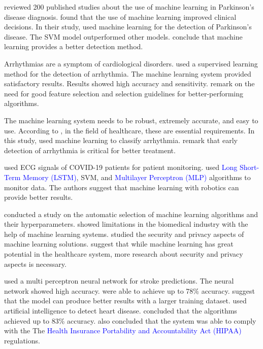 \documentclass[a4paper,fleqn]{cas-dc}
\newcommand{\responsemodsm}[1]{\textcolor{blue}{#1}}
\begin{document}
\cite*{ref_paper_27} reviewed 200 published studies about the use of machine learning in Parkinson's disease diagnosis. \citeauthor{ref_paper_27} found that the use of machine learning improved clinical decisions. In their study, \cite*{ref_paper_30} used machine learning for the detection of Parkinson's disease. The SVM model outperformed other models. \citeauthor{ref_paper_30} conclude that machine learning provides a better detection method.

Arrhythmias are a symptom of cardiological disorders. \cite*{ref_paper_28} used a supervised learning method for the detection of arrhythmia. The machine learning system provided satisfactory results. Results showed high accuracy and sensitivity. \citeauthor{ref_paper_28} remark on the need for good feature selection and selection guidelines for better-performing algorithms.

The machine learning system needs to be robust, extremely accurate, and easy to use. According to \cite*{ref_paper_4}, in the field of healthcare, these are essential requirements. In this study, \citeauthor{ref_paper_4} used machine learning to classify arrhythmia. \citeauthor{ref_paper_4} remark that early detection of arrhythmia is critical for better treatment.

\cite*{ref_paper_40} used ECG signals of COVID-19 patients for patient monitoring. \citeauthor{ref_paper_40} used \responsemodsm{Long Short-Term Memory (LSTM)}, SVM, and \responsemodsm{Multilayer Perceptron (MLP)} algorithms to monitor data. The authors suggest that machine learning with robotics can provide better results.

\cite*{ref_paper_32} conducted a study on the automatic selection of machine learning algorithms and their hyperparameters. \citeauthor{ref_paper_32} showed limitations in the biomedical industry with the help of machine learning systems. \cite*{ref_paper_37} studied the security and privacy aspects of machine learning solutions. \citeauthor{ref_paper_37} suggest that while machine learning has great potential in the healthcare system, more research about security and privacy aspects is necessary.

\cite*{ref_paper_42} used a multi perceptron neural network for stroke predictions. The neural network showed high accuracy. \citeauthor{ref_paper_42} were able to achieve up to 78\% accuracy. \citeauthor{ref_paper_42} suggest that the model can produce better results with a larger training dataset. \cite*{ref_paper_41} used artificial intelligence to detect heart disease. \citeauthor{ref_paper_41} concluded that the algorithms achieved up to 83\% accuracy. \citeauthor{ref_paper_41} also concluded that the system was able to comply with the The \responsemodsm{Health Insurance Portability and Accountability Act (HIPAA)} regulations.
\end{document}
